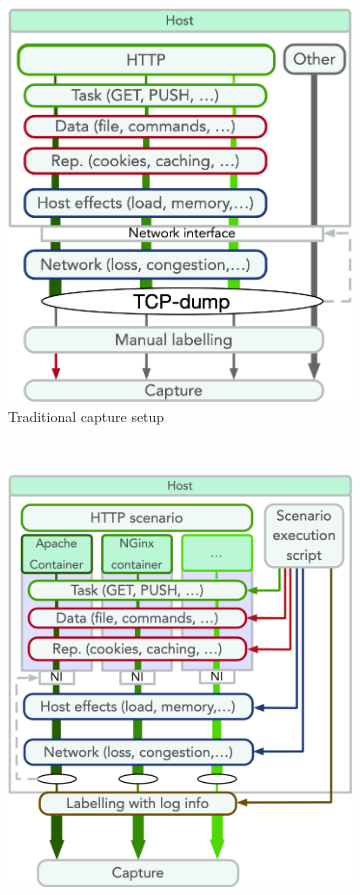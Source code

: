 \documentclass{article}
\begin{document}
\begin{figure}
\centering
\begin{subfigure}[b]{0.48\textwidth}
\includegraphics[width=\textwidth]{images/VM_setup_final.png}
\caption{Traditional capture setup}
\end{subfigure}
~
\begin{subfigure}[b]{0.48\textwidth}
\includegraphics[width=\textwidth]{images/Docker_setup_final.png}

\end{subfigure}
\end{figure}
\end{document}
